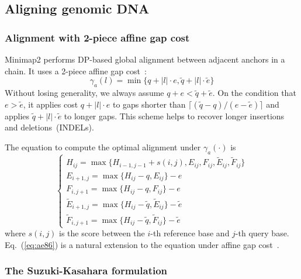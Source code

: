 \documentclass{bioinfo}
\begin{document}
\begin{methods}
\subsection{Aligning genomic DNA}\label{sec:genomic}

\subsubsection{Alignment with 2-piece affine gap cost}

Minimap2 performs DP-based global alignment between adjacent anchors in a
chain. It uses a 2-piece affine gap cost~\citep{Gotoh:1990aa}:
\begin{equation}\label{eq:2-piece}
\gamma_a(l)=\min\{q+|l|\cdot e,\tilde{q}+|l|\cdot\tilde{e}\}
\end{equation}
Without losing generality, we always assume $q+e<\tilde{q}+\tilde{e}$.
On the condition that $e>\tilde{e}$, it applies cost $q+|l|\cdot e$ to gaps
shorter than $\lceil(\tilde{q}-q)/(e-\tilde{e})\rceil$ and applies
$\tilde{q}+|l|\cdot\tilde{e}$ to longer gaps.  This scheme helps to recover
longer insertions and deletions~(INDELs).

The equation to compute the optimal alignment under $\gamma_a(\cdot)$ is
\begin{equation}\label{eq:ae86}
\left\{\begin{array}{l}
H_{ij} = \max\{H_{i-1,j-1}+s(i,j),E_{ij},F_{ij},\tilde{E}_{ij},\tilde{F}_{ij}\}\\
E_{i+1,j}= \max\{H_{ij}-q,E_{ij}\}-e\\
F_{i,j+1}= \max\{H_{ij}-q,F_{ij}\}-e\\
\tilde{E}_{i+1,j}= \max\{H_{ij}-\tilde{q},\tilde{E}_{ij}\}-\tilde{e}\\
\tilde{F}_{i,j+1}= \max\{H_{ij}-\tilde{q},\tilde{F}_{ij}\}-\tilde{e}
\end{array}\right.
\end{equation}
where $s(i,j)$ is the score between the $i$-th reference base and $j$-th query
base. Eq.~(\ref{eq:ae86}) is a natural extension to the equation under affine
gap cost~\citep{Gotoh:1982aa,Altschul:1986aa}.

\subsubsection{The Suzuki-Kasahara formulation}


\end{methods}
\end{document}
